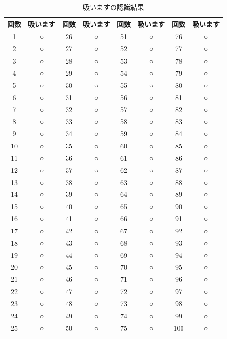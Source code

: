 \documentclass[12pt,oneside]{sotsuken_paper}
\begin{document}
\begin{table}[htb]
\begin{center}
\caption{吸いますの認識結果}
\begin{tabular}{|c|c|c|c|c|c|c|c|}\hline
回数&吸います&回数&吸います&回数&吸います&回数&吸います\\\hline
1&○&26&○&51&○&76&○\\\hline
2&○&27&○&52&○&77&○\\\hline
3&○&28&○&53&○&78&○\\\hline
4&○&29&○&54&○&79&○\\\hline
5&○&30&○&55&○&80&○\\\hline
6&○&31&○&56&○&81&○\\\hline
7&○&32&○&57&○&82&○\\\hline
8&○&33&○&58&○&83&○\\\hline
9&○&34&○&59&○&84&○\\\hline
10&○&35&○&60&○&85&○\\\hline
11&○&36&○&61&○&86&○\\\hline
12&○&37&○&62&○&87&○\\\hline
13&○&38&○&63&○&88&○\\\hline
14&○&39&○&64&○&89&○\\\hline
15&○&40&○&65&○&90&○\\\hline
16&○&41&○&66&○&91&○\\\hline
17&○&42&○&67&○&92&○\\\hline
18&○&43&○&68&○&93&○\\\hline
19&○&44&○&69&○&94&○\\\hline
20&○&45&○&70&○&95&○\\\hline
21&○&46&○&71&○&96&○\\\hline
22&○&47&○&72&○&97&○\\\hline
23&○&48&○&73&○&98&○\\\hline
24&○&49&○&74&○&99&○\\\hline
25&○&50&○&75&○&100&○
\\\hline
\end{tabular}
\label{tab:yeahsmokrecogresult}
\end{center}
\end{table}
\end{document}
